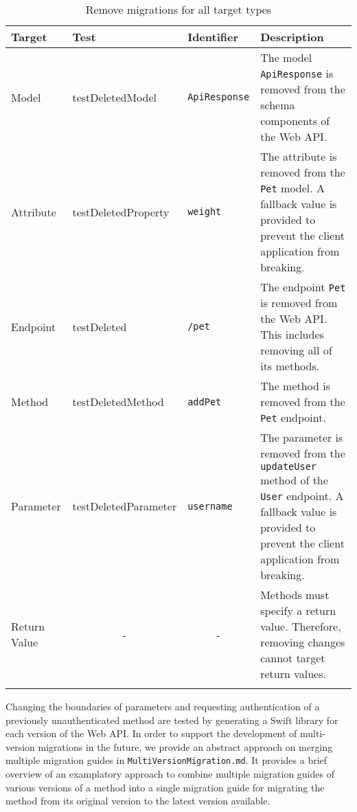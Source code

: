 	\begin{center}
		\begin{longtable}{@{}lp{}lp{}@{}}
			\toprule
			\textbf{Target} & \textbf{Test} & \textbf{Identifier} & \textbf{Description} \\ \midrule \endhead
			Model           &   test\-Deleted\-Model   &   \texttt{ApiResponse}      &  The model \texttt{ApiResponse} is removed from the schema components of the Web API.      \\
			Attribute       &  test\-Deleted\-Property    &  \texttt{weight}   &   The attribute is removed from the \texttt{Pet} model. A fallback value is provided to prevent the client application from breaking.       \\
			Endpoint        &  test\-Deleted    &    \texttt{/pet}     &   The endpoint \texttt{Pet} is removed from the Web API. This includes removing all of its methods. \\
			Method        &  test\-Deleted\-Method       &    \texttt{addPet}    &       The method is removed from the \texttt{Pet} endpoint.                          \\
			Parameter       &  test\-Deleted\-Parameter      &    \texttt{username}       &   The parameter is removed from the \texttt{updateUser} method of the \texttt{User} endpoint. A fallback value is provided to prevent the client application from breaking.        \\ 
			 Return Value    &            \multicolumn{1}{c}{-}  &    \multicolumn{1}{c}{-}                   &      Methods must specify a return value. Therefore, removing changes cannot target return values.    \\ \bottomrule
					\caption{Remove migrations for all target types}
			\label{tab:RemoveMigrationTests}
		\end{longtable}
	\end{center}

Changing the boundaries of parameters and requesting authentication of a previously unauthenticated method are tested by generating a Swift library for each version of the Web API. In order to support the development of multi-version migrations in the future, we provide an abstract approach on merging multiple migration guides in \texttt{MultiVersionMigration.md}. It provides a brief overview of an examplatory approach to combine multiple migration guides of various versions of a method into a single migration guide for migrating the method from its original version to the latest version available.

